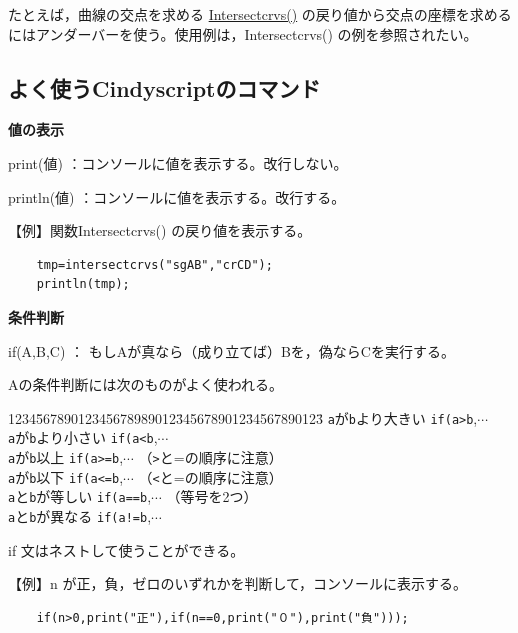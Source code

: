 \documentclass[papersize,a4paper,12pt,uplatex]{jsarticle}
\begin{document}
たとえば，曲線の交点を求める \hyperlink{intersectcrvs}{Intersectcrvs()} の戻り値から交点の座標を求めるにはアンダーバーを使う。使用例は，Intersectcrvs() の例を参照されたい。

\subsection{よく使うCindyscriptのコマンド}
\vspace{\baselineskip}
{\bf 値の表示}

print(値)   ：コンソールに値を表示する。改行しない。

println(値) ：コンソールに値を表示する。改行する。

\vspace{\baselineskip}
【例】関数Intersectcrvs() の戻り値を表示する。
\begin{verbatim}
    tmp=intersectcrvs("sgAB","crCD");
    println(tmp);
\end{verbatim}

\vspace{\baselineskip}
{\bf 条件判断}

if(A,B,C)  ： もしAが真なら（成り立てば）Bを，偽ならCを実行する。

Aの条件判断には次のものがよく使われる。
 \begin{tabbing}
1234\=56789012345678989012\=3456789012\=34567890123\=\kill
 \>  \verb|a|が\verb|b|より大きい \> \verb|if(a>b|,$\cdots$\\
 \>  \verb|a|が\verb|b|より小さい \> \verb|if(a<b|,$\cdots$\\
 \>  \verb|a|が\verb|b|以上  \> \verb|if(a>=b|,$\cdots$ （\verb|>|と=の順序に注意）\\
 \>  \verb|a|が\verb|b|以下  \> \verb|if(a<=b|,$\cdots$ （\verb|<|と=の順序に注意）\\
 \>  \verb|a|と\verb|b|が等しい \>  \verb|if(a==b|,$\cdots$ （等号を2つ）\\
 \>  \verb|a|と\verb|b|が異なる \> \verb|if(a!=b|,$\cdots$\\
\end{tabbing}

if 文はネストして使うことができる。

\vspace{\baselineskip}
  【例】n が正，負，ゼロのいずれかを判断して，コンソールに表示する。
\begin{verbatim}
    if(n>0,print("正"),if(n==0,print("０"),print("負")));
\end{verbatim}
\end{document}
